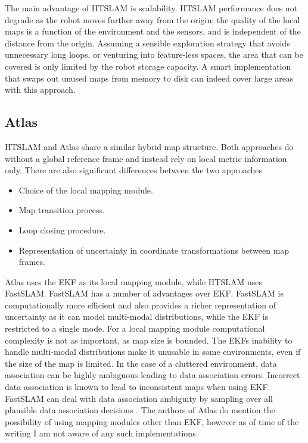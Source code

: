 The main advantage of HTSLAM is scalability. HTSLAM performance does
not degrade as the robot moves further away from the origin; the
quality of the local maps is a function of the environment and the
sensors, and is independent of the distance from the origin. Assuming
a sensible exploration strategy that avoids unnecessary long loops, or
venturing into feature-less spaces, the area that can be covered is
only limited by the robot storage capacity. A smart implementation
that swaps out unused maps from memory to disk can indeed cover large
areas with this approach.

\subsection{Atlas}

HTSLAM and Atlas share a similar hybrid map structure. Both approaches
do without a global reference frame and instead rely on local metric
information only. There are also significant differences between the
two approaches

\begin{itemize}
\item Choice of the local mapping module.
\item Map transition process.
\item Loop closing procedure.
\item Representation of uncertainty in coordinate transformations
  between map frames.
\end{itemize}

Atlas uses the EKF as its local mapping module, while HTSLAM uses
FastSLAM. FastSLAM has a number of advantages over EKF. FastSLAM is
computationally more efficient and also provides a richer
representation of uncertainty as it can model multi-modal
distributions, while the EKF is restricted to a single mode. For a local
mapping module computational complexity is not as important, as map
size is bounded. The EKFs inability to handle multi-modal distributions
make it unusable in some environments, even if the size of the map is
limited. In the case of a cluttered environment, data association can be
highly ambiguous leading to data association errors. Incorrect data
association is known to lead to inconsistent maps when using EKF.
FastSLAM can deal with data association ambiguity by sampling over all
plausible data association decisions
\cite{fastslam,Montemerlo2003,nieto2003}. The authors of Atlas do mention
the possibility of using mapping modules other than EKF, however as of
time of the writing I am not aware of any such implementations.

